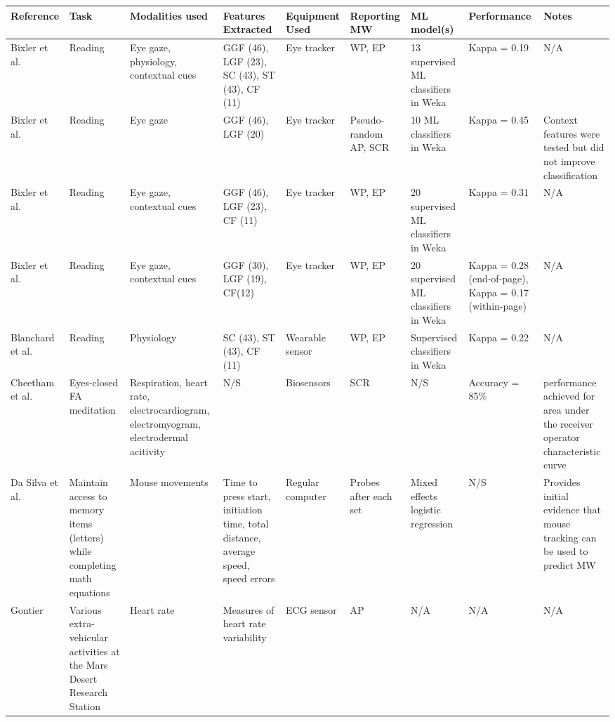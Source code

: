 \begin{xtabular}{p{25mm}p{30mm}p{30mm}p{22mm}p{38mm}p{22mm}p{33mm}p{22mm}p{35mm}}
  \toprule
        Reference & Task & Modalities used & Features Extracted \footnotemark[1] & Equipment Used & Reporting MW \footnotemark[2] & ML model(s) & Performance & Notes\\
  \midrule
  Bixler et al. \cite{Bixler2015AutomaticPhysiology} & Reading & Eye gaze, physiology, contextual cues & GGF (46), LGF (23), SC (43), ST (43), CF (11)  & Eye tracker & WP, EP & 13 supervised ML classifiers in Weka & Kappa = 0.19 & N/A \\
  \midrule
  Bixler et al. \cite{Bixler2015AutomaticAwareness} & Reading & Eye gaze & GGF (46), LGF (20) & Eye tracker & Pseudo-random AP, SCR & 10 ML classifiers in Weka & Kappa = 0.45 & Context features were tested but did not improve classification\\
  \midrule
  Bixler et al. \cite{Bixler2016AutomaticReading} & Reading & Eye gaze, contextual cues & GGF (46), LGF (23), CF (11) & Eye tracker & WP, EP & 20 supervised ML classifiers in Weka & Kappa = 0.31 & N/A \\
  \midrule
  Bixler et al. \cite{Bixler2014TowardWandering} & Reading & Eye gaze, contextual cues & GGF (30), LGF (19), CF(12) & Eye tracker & WP, EP & 20 supervised ML classifiers in Weka & Kappa = 0.28 (end-of-page), Kappa = 0.17 (within-page) & N/A \\
  \midrule
  Blanchard et al. \cite{Blanchard2014AutomatedLearning} & Reading & Physiology & SC (43), ST (43), CF (11) & Wearable sensor & WP, EP & Supervised classifiers in Weka & Kappa = 0.22 & N/A \\
  \midrule
  Cheetham et al. \cite{Cheetham2016AutomatedApplication} & Eyes-closed FA meditation & Respiration, heart rate, electrocardiogram, electromyogram, electrodermal acitivity & N/S & Biosensors & SCR & N/S & Accuracy = 85\% & performance achieved for area under the receiver operator characteristic curve\\
  \midrule
  Da Silva et al. \cite{DaSilva2018WanderingWandering} & Maintain access to memory items (letters) while completing math equations & Mouse movements & Time to press start, initiation time, total distance, average speed, speed errors & Regular computer & Probes after each set & Mixed effects logistic regression & N/S & Provides initial evidence that mouse tracking can be used to predict MW\\
  \midrule
  Gontier \cite{Gontier2016HowEnvironment} & Various extra-vehicular activities at the Mars Desert Research Station & Heart rate & Measures of heart rate variability & ECG sensor & AP & N/A & N/A & N/A \\

\end{xtabular}
